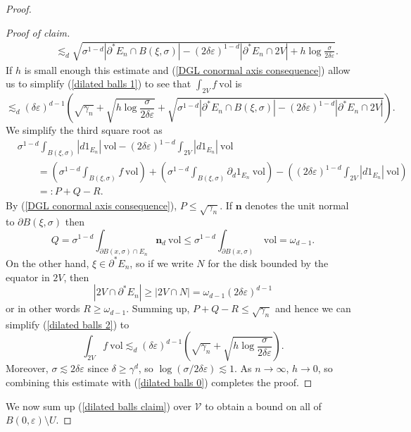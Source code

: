 \documentclass[reqno,12pt,letterpaper]{amsart}
\newcommand{\normal}{\mathbf n}
\newcommand{\vol}{\mathrm{vol}}
\theoremstyle{definition}
\numberwithin{equation}{section}
\begin{document}
\begin{proof}
\begin{proof}[Proof of claim]
\begin{align*}
& \qquad \lesssim_d \sqrt{\sigma^{1 - d} |\partial^* E_n \cap B(\xi, \sigma)| - (2\delta\varepsilon)^{1 - d} |\partial^* E_n \cap 2V| + h \log \frac{\sigma}{2\delta\varepsilon}}.
\end{align*}
If $h$ is small enough this estimate and (\ref{DGL conormal axis consequence}) allow us to simplify (\ref{dilated balls 1}) to see that $\int_{2V} f ~\vol$ is
\begin{equation}\label{dilated balls 2}
\lesssim_d (\delta \varepsilon)^{d - 1} \left(\sqrt{\gamma_n} + \sqrt{h \log \frac{\sigma}{2\delta\varepsilon}} + \sqrt{\sigma^{1 - d} |\partial^* E_n \cap B(\xi, \sigma)| - (2\delta\varepsilon)^{1 - d} |\partial^* E_n \cap 2V|}\right).
\end{equation}
We simplify the third square root as
\begin{align*}
&\sigma^{1 - d} \int_{B(\xi, \sigma)} |d1_{E_n}| ~\vol - (2\delta\varepsilon)^{1 - d} \int_{2V} |d1_{E_n}| ~\vol\\
&\qquad = \left(\sigma^{1 - d} \int_{B(\xi, \sigma)} f ~\vol\right) + \left(\sigma^{1 - d} \int_{B(\xi, \sigma)} \partial_d 1_{E_n} ~\vol\right) - \left((2\delta\varepsilon)^{1 - d} \int_{2V} |d1_{E_n}| ~\vol\right)\\
&\qquad=: P + Q - R.
\end{align*}
By (\ref{DGL conormal axis consequence}), $P \leq \sqrt{\gamma_n}$.
If $\normal$ denotes the unit normal to $\partial B(\xi, \sigma)$ then
$$Q = \sigma^{1 - d} \int_{\partial B(x, \sigma) \cap E_n} \normal_d ~\vol \leq \sigma^{1 - d} \int_{\partial B(x, \sigma)} ~\vol = \omega_{d - 1}.$$
On the other hand, $\xi \in \partial^* E_n$, so if we write $N$ for the disk bounded by the equator in $2V$, then
$$|2V \cap \partial^* E_n| \geq |2V \cap N| = \omega_{d - 1}(2\delta\varepsilon)^{d - 1}$$
or in other words $R \geq \omega_{d - 1}$.
Summing up, $P + Q - R \leq \sqrt{\gamma_n}$ and hence we can simplify (\ref{dilated balls 2}) to
$$\int_{2V} f ~\vol \lesssim_d (\delta \varepsilon)^{d - 1} \left(\sqrt{\gamma_n} + \sqrt{h \log \frac{\sigma}{2\delta\varepsilon}}\right).$$
Moreover, $\sigma \lesssim 2\delta\varepsilon$ since $\delta \geq \gamma^d$, so $\log(\sigma/2\delta\varepsilon) \lesssim 1$.
As $n \to \infty$, $h \to 0$, so combining this estimate with (\ref{dilated balls 0}) completes the proof.
\end{proof}

We now sum up (\ref{dilated balls claim}) over $\mathcal V$ to obtain a bound on all of $B(0, \varepsilon) \setminus U$.


\end{proof}
\end{document}
